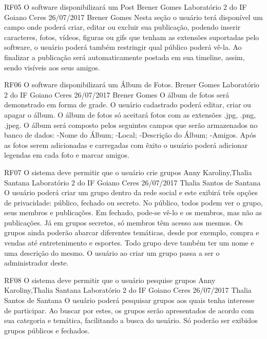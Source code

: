 \documentclass[versao=digital]{ifgoiano_ceres_tc_v2}
\begin{document}
\requisitoFuncional
{RF05}
{O software disponibilizará um Post}
{Brener Gomes}
{Laboratório 2 do IF Goiano Ceres}
{26/07/2017}
{Brener Gomes}
{Nesta seção o usuário terá disponível um campo onde poderá criar, editar ou excluir sua publicação, podendo inserir caracteres, fotos, vídeos, figuras ou gifs que tenham as extensões suportadas pelo software, o usuário poderá também restringir qual público poderá vê-la. Ao finalizar a publicação será automaticamente postada em sua timeline, assim, sendo visíveis aos seus amigos.
}

\requisitoFuncional
{RF06}
{O software disponibilizará um Álbum de Fotos.}
{Brener Gomes}
{Laboratório 2 do IF Goiano Ceres}
{26/07/2017}
{Brener Gomes}
{O álbum de fotos será demonstrado em forma de grade. O usuário cadastrado poderá editar, criar ou apagar o álbum. O álbum de fotos só aceitará fotos com as extensões .jpg, .png, .jpeg. O álbum será composto pelos seguintes campos que serão armazenados no banco de dados:
-Nome do Álbum;
-Local;
-Descrição do Álbum;
-Amigos.
Após as fotos serem adicionadas e carregadas com êxito o usuário poderá adicionar legendas em cada foto e marcar amigos.
}

\requisitoFuncional
{RF07}
{O sistema deve permitir que o usuário crie grupos}
{Anny Karoliny,Thalia Santana}
{Laboratório 2 do IF Goiano Ceres}
{26/07/2017}
{Thalia Santos de Santana}
{O usuário poderá criar um grupo dentro da rede social e este exibirá três opções de privacidade: público, fechado ou secreto. No público, todos podem ver o grupo, seus membros e publicações. Em fechado, pode-se vê-lo e os membros, mas não as publicações. Já em grupos secretos, só membros têm acesso aos mesmos. Os grupos ainda poderão abarcar diferentes temáticas, desde por exemplo, compra e vendas até entretenimento e esportes. Todo grupo deve também ter um nome e uma descrição do mesmo. O usuário ao criar um grupo passa a ser o administrador deste.
}

\requisitoFuncional
{RF08}
{O sistema deve permitir que o usuário pesquise grupos}
{Anny Karoliny,Thalia Santana}
{Laboratório 2 do IF Goiano Ceres}
{26/07/2017}
{Thalia Santos de Santana}
{O usuário poderá pesquisar grupos aos quais tenha interesse de participar. Ao buscar por estes, os grupos serão apresentados de acordo com sua categoria e temática, facilitando a busca do usuário. Só poderão ser exibidos grupos públicos e fechados.
}
\end{document}
